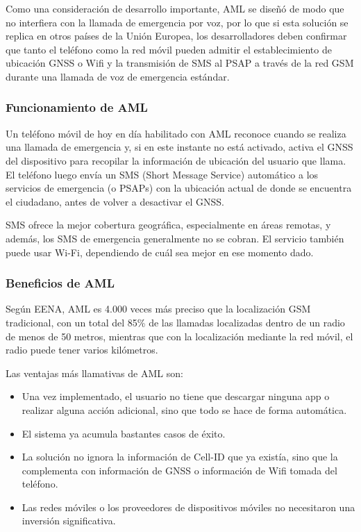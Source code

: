 Como una consideración de desarrollo importante, AML se diseñó de modo que no interfiera con la llamada de emergencia por voz, por lo que si esta solución se replica en otros países de la Unión Europea, los desarrolladores deben confirmar que tanto el teléfono como la red móvil pueden admitir el establecimiento de ubicación GNSS o Wifi y la transmisión de SMS al PSAP a través de la red GSM durante una llamada de voz de emergencia estándar.

\subsubsection{Funcionamiento de AML}

Un teléfono móvil de hoy en día habilitado con AML reconoce cuando se realiza una llamada de emergencia y, si en este instante no está activado, activa el GNSS del dispositivo para recopilar la información de ubicación del usuario que llama. El teléfono luego envía un SMS (Short Message Service) automático a los servicios de emergencia (o PSAPs) con la ubicación actual de donde se encuentra el ciudadano, antes de volver a desactivar el GNSS.

SMS ofrece la mejor cobertura geográfica, especialmente en áreas remotas, y además, los SMS de emergencia generalmente no se cobran. El servicio también puede usar Wi-Fi, dependiendo de cuál sea mejor en ese momento dado.

\subsubsection{Beneficios de AML}

Según EENA, AML es 4.000 veces más preciso que la localización GSM tradicional, con un total del 85\% de las llamadas localizadas dentro de un radio de menos de 50 metros, mientras que con la localización mediante la red móvil, el radio puede tener varios kilómetros.

Las ventajas más llamativas de AML son:

\begin{itemize}
  \item Una vez implementado, el usuario no tiene que descargar ninguna app o realizar alguna acción adicional, sino que todo se hace de forma automática.
  \item El sistema ya acumula bastantes casos de éxito.
  \item La solución no ignora la información de Cell-ID que ya existía, sino que la complementa con información de GNSS o información de Wifi tomada del teléfono.
  \item Las redes móviles o los proveedores de dispositivos móviles no necesitaron una inversión significativa.
\end{itemize}

